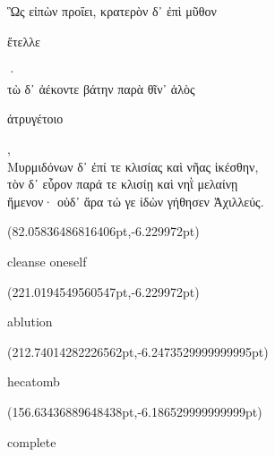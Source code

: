 \documentclass{ransom}
\begin{document}
\begin{foreignpage}
\begin{graytext}
Ὣς εἰπὼν προΐει, κρατερὸν δ᾽ ἐπὶ μῦθον \begin{whitetext}ἔτελλε\end{whitetext}·\\
τὼ δ᾽ ἀέκοντε βάτην παρὰ θῖν᾽ ἁλὸς \begin{whitetext}ἀτρυγέτοιο\end{whitetext},\\
Μυρμιδόνων δ᾽ ἐπί τε κλισίας καὶ νῆας ἱκέσθην,\\
τὸν δ᾽ εὗρον παρά τε κλισίῃ καὶ νηῒ μελαίνῃ\\
ἥμενον· οὐδ᾽ ἄρα τώ γε ἰδὼν γήθησεν Ἀχιλλεύς.\hfill{}\\

\end{graytext}

{\linespread{1.0}\footnotesize \begin{textblock*}{75.59384pt}(82.05836486816406pt,\pdfpageheight-557.3775939941406pt-6.229972pt)\parbox[b]{75.59384pt}{\begin{blacktext}\begin{latin}cleanse oneself\end{latin}\end{blacktext}}\end{textblock*}
\begin{textblock*}{37.69762pt}(221.0194549560547pt,\pdfpageheight-557.3775939941406pt-6.229972pt)\parbox[b]{37.69762pt}{\begin{blacktext}\begin{latin}ablution\end{latin}\end{blacktext}}\end{textblock*}
\begin{textblock*}{54.54176pt}(212.74014282226562pt,\pdfpageheight-530.3775939941406pt-6.2473529999999995pt)\parbox[b]{54.54176pt}{\begin{blacktext}\begin{latin}hecatomb\end{latin}\end{blacktext}}\end{textblock*}
\begin{textblock*}{52.444pt}(156.63436889648438pt,\pdfpageheight-530.3775939941406pt-6.186529999999999pt)\parbox[b]{52.444pt}{\begin{blacktext}\begin{latin}complete\end{latin}\end{blacktext}}\end{textblock*}
}
\end{foreignpage}
\end{document}
